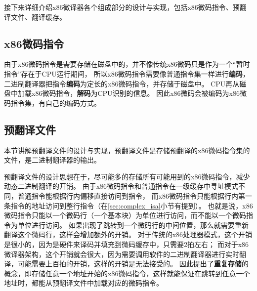 接下来详细介绍x86微译器各个组成部分的设计与实现，包括x86微码指令、预翻译文件、翻译缓存。

\subsection{x86微码指令}\label{sec:tisa}


由于x86微码指令是需要存储在磁盘中的，并不像传统x86微码只是作为一个“暂时指令”存在于CPU运行期间，
所以x86微码指令需要像普通指令集一样进行\textbf{编码}，
二进制翻译器把指令\textbf{编码}为定长的x86微码指令，并存储于磁盘中。
CPU再从磁盘中加载x86微码指令，\textbf{解码}为CPU识别的信息。
因此x86微码会被编码为x86微码指令集，有自己的编码方式。

\subsection{预翻译文件}\label{sec:aot}

本节讲解预翻译文件的设计与实现，预翻译文件是存储预翻译的x86微码指令集的文件，是二进制翻译器的输出。

预翻译文件的设计思想在于，尽可能多的存储所有可能用到的x86微码指令，减少动态二进制翻译的开销。
由于x86微码指令和普通指令在一级缓存中寻址模式不同，普通指令能根据行内偏移直接访问到指令，
而x86微码指令只能根据行内第一条指令的地址访问到整行指令（在\ref{sec:complex_isa}小节有提到）。
也就是说，x86微码指令只能以一个微码行（一个基本块）为单位进行访问，而不能以一个微码指令为单位进行访问。
如果出现了跳转到一个微码行的中间位置，那么就需要重新翻译这个微码行，这样会增加额外的开销。
对于传统的x86处理器模式，这个开销是很小的，因为是硬件来译码并填充到微码缓存中，只需要2拍左右；
而对于x86微译器架构，这个开销就会很大，因为需要调用软件的二进制翻译器进行实时翻译，可能需要上百拍的开销，这样的开销是无法接受的。
因此提出了\textbf{重复存储}的概念，即存储任意一个地址开始的x86微码指令，这样就能保证在跳转到任意一个地址时，都能从预翻译文件中加载对应的微码指令。


